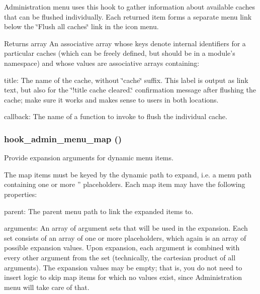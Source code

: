 Administration menu uses this hook to gather information about available caches that can be flushed individually. Each returned item forms a separate menu link below the \char`\"{}Flush all caches\char`\"{} link in the icon menu.

\begin{DoxyReturn}{Returns}
array An associative array whose keys denote internal identifiers for a particular caches (which can be freely defined, but should be in a module's namespace) and whose values are associative arrays containing:
\begin{DoxyItemize}
\item title: The name of the cache, without \char`\"{}cache\char`\"{} suffix. This label is output as link text, but also for the \char`\"{}!title cache cleared.\char`\"{} confirmation message after flushing the cache; make sure it works and makes sense to users in both locations.
\item callback: The name of a function to invoke to flush the individual cache. 
\end{DoxyItemize}
\end{DoxyReturn}
\hypertarget{admin__menu_8api_8php_a4b3f2235db483f670a2e7327633868df}{
\subsubsection[{hook\_\-admin\_\-menu\_\-map}]{\setlength{\rightskip}{0pt plus 5cm}hook\_\-admin\_\-menu\_\-map ()}}
\label{admin__menu_8api_8php_a4b3f2235db483f670a2e7327633868df}
Provide expansion arguments for dynamic menu items.

The map items must be keyed by the dynamic path to expand, i.e. a menu path containing one or more '' placeholders. Each map item may have the following properties:
\begin{DoxyItemize}
\item parent: The parent menu path to link the expanded items to.
\item arguments: An array of argument sets that will be used in the expansion. Each set consists of an array of one or more placeholders, which again is an array of possible expansion values. Upon expansion, each argument is combined with every other argument from the set (technically, the cartesian product of all arguments). The expansion values may be empty; that is, you do not need to insert logic to skip map items for which no values exist, since Administration menu will take care of that.
\end{DoxyItemize}

